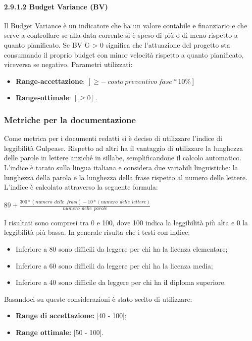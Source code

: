 \paragraph{2.9.1.2 Budget Variance (BV)}
Il Budget Variance è un indicatore che ha un valore contabile e finanziario e che serve a controllare se alla data corrente si è speso di più o di meno rispetto a quanto pianificato.
Se BV G > 0 significa che l'attuazione del progetto sta consumando il proprio budget con minor velocità rispetto a quanto pianificato, viceversa se negativo.
Parametri utilizzati:
\begin{itemize}
	\item \textbf{Range-accettazione}: $\left[  \geq - \: costo \: preventivo \: fase * 10 \% \right]$
	\item \textbf{Range-ottimale}: $\left[\geq 0\right]$.
\end{itemize}

\subsubsection{Metriche per la documentazione}
\label{sezione 3.8}
Come metrica per i documenti redatti si è deciso di utilizzare l'indice di leggibilità Gulpease. Rispetto ad altri ha il vantaggio di utilizzare la lunghezza delle parole in lettere anziché in sillabe, semplificandone il calcolo automatico. L'indice è tarato sulla lingua italiana e considera due variabili linguistiche: la lunghezza della parola e la lunghezza della frase rispetto al numero delle lettere. \\
\noindent L'indice è calcolato attraverso la seguente formula:\\
\begin{center}
	$89+ \frac{300*\left(numero\:\ delle\:\ frasi \right)-10*\left(numero\:\ delle\:\ lettere\right)}{numero\:\ delle\:\ parole}$
\end{center}
I risultati sono compresi tra 0 e 100, dove 100 indica la leggibilità più alta e 0 la leggibilità più bassa. In generale risulta che i testi con indice:
\begin{itemize}
	\item Inferiore a 80 sono difficili da leggere per chi ha la licenza elementare;
	\item Inferiore a 60 sono difficili da leggere per chi ha la licenza media;
	\item Inferiore a 40 sono difficile da leggere per chi ha il diploma superiore.
\end{itemize}
Basandoci su queste considerazioni è stato scelto di utilizzare:
\begin{itemize}
	\item \textbf{Range di accettazione:} [40 - 100];
	\item \textbf{Range ottimale:} [50 - 100].
\end{itemize}

